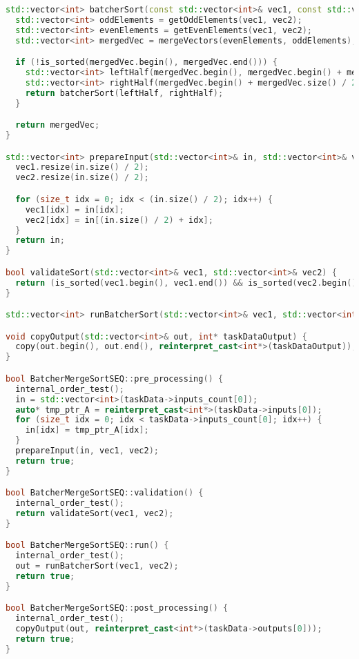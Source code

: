 \documentclass{report}
\begin{document}
\begin{lstlisting}[language=C++,caption=Последовательная версия]
std::vector<int> batcherSort(const std::vector<int>& vec1, const std::vector<int>& vec2) {
  std::vector<int> oddElements = getOddElements(vec1, vec2);
  std::vector<int> evenElements = getEvenElements(vec1, vec2);
  std::vector<int> mergedVec = mergeVectors(evenElements, oddElements);

  if (!is_sorted(mergedVec.begin(), mergedVec.end())) {
    std::vector<int> leftHalf(mergedVec.begin(), mergedVec.begin() + mergedVec.size() / 2);
    std::vector<int> rightHalf(mergedVec.begin() + mergedVec.size() / 2, mergedVec.end());
    return batcherSort(leftHalf, rightHalf);
  }

  return mergedVec;
}

std::vector<int> prepareInput(std::vector<int>& in, std::vector<int>& vec1, std::vector<int>& vec2) {
  vec1.resize(in.size() / 2);
  vec2.resize(in.size() / 2);

  for (size_t idx = 0; idx < (in.size() / 2); idx++) {
    vec1[idx] = in[idx];
    vec2[idx] = in[(in.size() / 2) + idx];
  }
  return in;
}

bool validateSort(std::vector<int>& vec1, std::vector<int>& vec2) {
  return (is_sorted(vec1.begin(), vec1.end()) && is_sorted(vec2.begin(), vec2.end()));
}

std::vector<int> runBatcherSort(std::vector<int>& vec1, std::vector<int>& vec2) { return batcherSort(vec1, vec2); }

void copyOutput(std::vector<int>& out, int* taskDataOutput) {
  copy(out.begin(), out.end(), reinterpret_cast<int*>(taskDataOutput));
}

bool BatcherMergeSortSEQ::pre_processing() {
  internal_order_test();
  in = std::vector<int>(taskData->inputs_count[0]);
  auto* tmp_ptr_A = reinterpret_cast<int*>(taskData->inputs[0]);
  for (size_t idx = 0; idx < taskData->inputs_count[0]; idx++) {
    in[idx] = tmp_ptr_A[idx];
  }
  prepareInput(in, vec1, vec2);
  return true;
}

bool BatcherMergeSortSEQ::validation() {
  internal_order_test();
  return validateSort(vec1, vec2);
}

bool BatcherMergeSortSEQ::run() {
  internal_order_test();
  out = runBatcherSort(vec1, vec2);
  return true;
}

bool BatcherMergeSortSEQ::post_processing() {
  internal_order_test();
  copyOutput(out, reinterpret_cast<int*>(taskData->outputs[0]));
  return true;
}
\end{lstlisting}

\newpage
\end{document}
